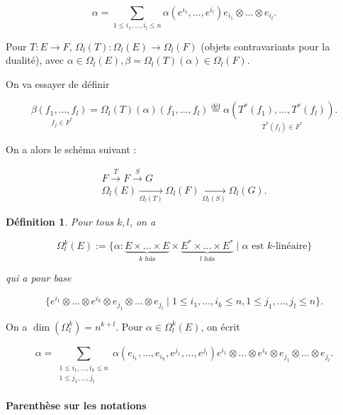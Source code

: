 \documentclass[french]{article}
\newtheorem{definition}{Définition}[section]
\begin{document}
\[\alpha = \sum_{1 \leq i_1, \dots, i_l \leq n}^{} \alpha(e ^{i_1}, \dots, e ^{i_l}) e _{i_1} \otimes \dots \otimes e _{i_l}.\]

Pour \( T : E \longrightarrow F\), \(\Omega _{l}(T) : \Omega _{l}(E) \to \Omega _{l}(F)\) (objets contravariants pour la dualité), avec \(\alpha \in \Omega _{l}(E), \beta = \Omega _{l}(T)(\alpha) \in \Omega _{l}(F)\).

On va essayer de définir

\[\beta \underset{f_j \in F ^{*}}{(f_1, \dots, f_l)} = \Omega _{l}(T)(\alpha)(f_1, \dots, f_l) \stackrel{\text{déf}}{=} \alpha \underset{T ^{*}(f_j) \in F ^{*}}{(T ^{*}(f_1), \dots, T ^{*}(f_l))}.\]

On a alors le schéma suivant :

\begin{gather*}
  F \stackrel{T}{\longrightarrow} F \stackrel{S}{\longrightarrow} G \\
  \Omega _{l}(E) \underset{\Omega _{l}(T)}{\longrightarrow}\Omega _{l}(F) \underset{\Omega _{l}(S)}{\longrightarrow} \Omega _{l}(G).
\end{gather*}


\begin{definition}
  Pour tous \( k, l\), on a

  \[\Omega ^{k} _{l}(E) := \{ \alpha : \underbrace{E \times \dots \times E}_{k \text{ fois}} \times \underbrace{E ^{*} \times \dots \times E ^{*}}_{l \text{ fois}} \mid \alpha \text{ est } k \text{-linéaire}\}\]

  qui a pour base

  \[\{ e ^{i_1} \otimes \dots \otimes e ^{i_k} \otimes e _{j_1} \otimes \dots \otimes e _{j_l} \mid 1 \leq i_1, \dots, i_k \leq n, 1 \leq j_1, \dots, j_l \leq n\}.\]
\end{definition}

On a \(\operatorname{dim}(\Omega ^{k} _{l}) = n ^{k+l}\). Pour \(\alpha \in \Omega _{l} ^{k}(E)\), on écrit

\[\alpha = \sum_{\substack{1 \leq i_1, \dots, i_k \leq n \\ 1 \leq j_1, \dots, j_l}}^{} \alpha(e _{i_1}, \dots, e _{i_k}, e ^{j_1}, \dots, e ^{j_l}) e ^{i_1} \otimes \dots \otimes e ^{i_k} \otimes e _{j_1} \otimes \dots \otimes e _{j_l}. \]

\paragraph{Parenthèse sur les notations}
\end{document}
